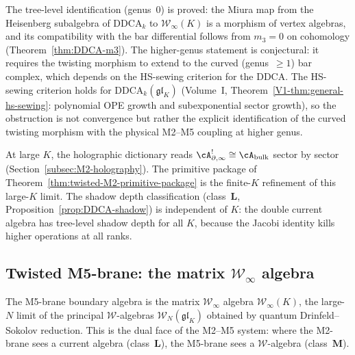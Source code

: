 \begin{remark}[M2--M5 coupling]
\label{rem:M2-M5-coupling-scope}
The tree-level identification (genus~$0$) is proved: the Miura
map from the Heisenberg subalgebra of $\mathrm{DDCA}_k$ to
$\mathcal{W}_\infty(K)$ is a morphism of vertex algebras, and
its compatibility with the bar differential follows from
$m_3 = 0$ on cohomology
(Theorem~\ref{thm:DDCA-m3}). The higher-genus statement is
conjectural: it requires the twisting morphism to extend to the
curved (genus~$\ge 1$) bar complex, which depends on the
HS-sewing criterion for the DDCA. The HS-sewing criterion
holds for $\mathrm{DDCA}_k(\mathfrak{gl}_K)$
(Volume~I, Theorem~\ref*{V1-thm:general-hs-sewing}: polynomial OPE growth
and subexponential sector growth), so the obstruction is not
convergence but rather the explicit identification of the
curved twisting morphism with the physical M2--M5 coupling at
higher genus.
\end{remark}

\begin{remark}
\label{rem:M2-large-K}
At large $K$, the holographic dictionary reads
$\cA_{\partial,\infty}^! \cong \cA_{\mathrm{bulk}}$
sector by sector (Section~\ref{subsec:M2-holography}).
The primitive package of
Theorem~\ref{thm:twisted-M2-primitive-package} is the
finite-$K$ refinement of this large-$K$ limit. The shadow
depth classification (class~$\mathbf{L}$,
Proposition~\ref{prop:DDCA-shadow}) is independent of $K$:
the double current algebra has tree-level shadow depth for
all $K$, because the Jacobi identity kills higher operations
at all ranks.
\end{remark}

%
%

\subsection{Twisted M5-brane: the matrix \texorpdfstring{$\mathcal{W}_\infty$}{W-infinity} algebra}
\label{subsec:twisted-M5-primitive}

The M5-brane boundary algebra is the matrix $\mathcal{W}_\infty$
algebra $\mathcal{W}_\infty(K)$, the large-$N$ limit of the
principal $\mathcal{W}$-algebras $\mathcal{W}_N(\mathfrak{gl}_K)$
obtained by quantum Drinfeld--Sokolov reduction. This is the
dual face of the M2--M5 system: where the M2-brane sees a
current algebra (class~$\mathbf{L}$), the M5-brane sees a
$\mathcal{W}$-algebra (class~$\mathbf{M}$).

